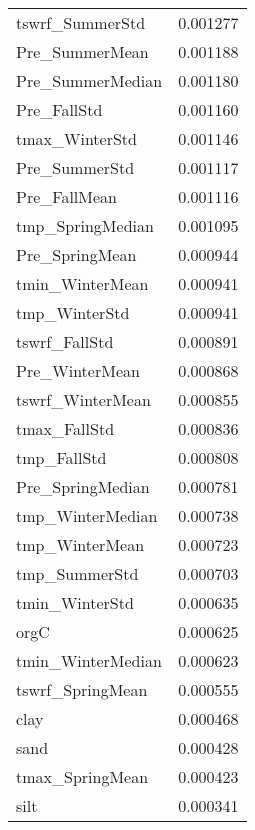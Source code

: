 \begin{tabular}{lr}
tswrf_SummerStd & 0.001277 \\
Pre_SummerMean & 0.001188 \\
Pre_SummerMedian & 0.001180 \\
Pre_FallStd & 0.001160 \\
tmax_WinterStd & 0.001146 \\
Pre_SummerStd & 0.001117 \\
Pre_FallMean & 0.001116 \\
tmp_SpringMedian & 0.001095 \\
Pre_SpringMean & 0.000944 \\
tmin_WinterMean & 0.000941 \\
tmp_WinterStd & 0.000941 \\
tswrf_FallStd & 0.000891 \\
Pre_WinterMean & 0.000868 \\
tswrf_WinterMean & 0.000855 \\
tmax_FallStd & 0.000836 \\
tmp_FallStd & 0.000808 \\
Pre_SpringMedian & 0.000781 \\
tmp_WinterMedian & 0.000738 \\
tmp_WinterMean & 0.000723 \\
tmp_SummerStd & 0.000703 \\
tmin_WinterStd & 0.000635 \\
orgC & 0.000625 \\
tmin_WinterMedian & 0.000623 \\
tswrf_SpringMean & 0.000555 \\
clay & 0.000468 \\
sand & 0.000428 \\
tmax_SpringMean & 0.000423 \\
silt & 0.000341 \\
\bottomrule
\end{tabular}
